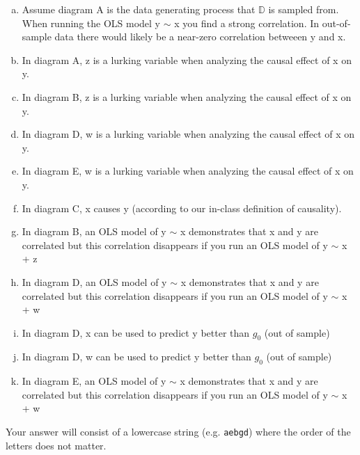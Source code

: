 \documentclass[12pt,landscape]{article}
\newcommand{\instr}{\small Your answer will consist of a lowercase string (e.g. \texttt{aebgd}) where the order of the letters does not matter. \normalsize}
\begin{document}
\begin{enumerate}[(a)]
\item Assume  diagram A is the data generating process that $\mathbb{D}$ is sampled from. When running the OLS model y $\sim$ x you find a strong correlation. In out-of-sample data there would likely be a near-zero correlation betweeen y and x.
\item In diagram A, z is a lurking variable when analyzing the causal effect of x on y.
\item In diagram B, z is a lurking variable when analyzing the causal effect of x on y.
\item In diagram D, w is a lurking variable when analyzing the causal effect of x on y.
\item In diagram E, w is a lurking variable when analyzing the causal effect of x on y.
\item In diagram C, x causes y (according to our in-class definition of causality).
\item In diagram B, an OLS model of y $\sim$ x demonstrates that x and y are correlated but this correlation disappears if you run an OLS model of y $\sim$ x + z
\item In diagram D, an OLS model of y $\sim$ x demonstrates that x and y are correlated but this correlation disappears if you run an OLS model of y $\sim$ x + w
\item In diagram D, x can be used to predict y better than $g_0$ (out of sample)
\item In diagram D, w can be used to predict y better than $g_0$ (out of sample)
\item In diagram E, an OLS model of y $\sim$ x demonstrates that x and y are correlated but this correlation disappears if you run an OLS model of y $\sim$ x + w

\end{enumerate}
\eenum\instr\pagebreak
\end{document}
